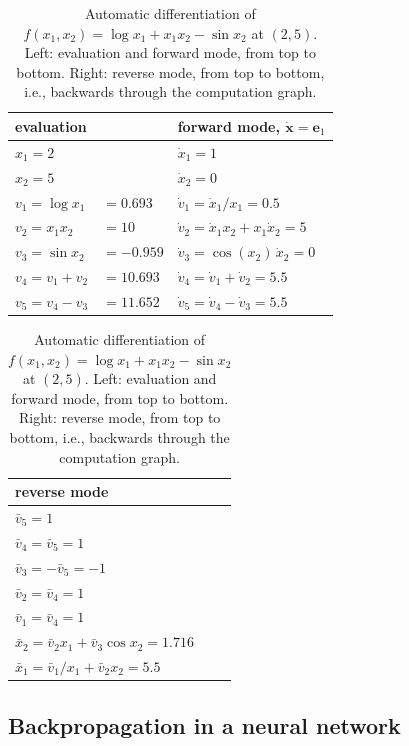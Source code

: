 \begin{table}[ht]
    \centering
    \renewcommand{\arraystretch}{1.3}
    \begin{tabular}{lll}
        \hline
        evaluation & & forward mode, $\dot{\mathbf{x}} = \mathbf{e}_1$ \\
        \hline
        $x_1 = 2$ & & $\dot x_1 = 1$ \\
        $x_2 = 5$ & & $\dot x_2 = 0$ \\
        $v_1 = \log x_1$ & $= 0.693$ & $\dot v_1 = \dot x_1 / x_1 = 0.5$ \\
        $v_2 = x_1 x_2$ & $= 10$ & $\dot v_2 = \dot x_1 x_2 + x_1 \dot x_2 = 5$ \\
        $v_3 = \sin x_2$ & $= -0.959$ & $\dot v_3 = \cos(x_2)\, \dot x_2 = 0$ \\
        $v_4 = v_1 + v_2$ & $= 10.693$ & $\dot v_4 = \dot v_1 + \dot v_2 = 5.5$ \\
        $v_5 = v_4 - v_3$ & $= 11.652$ & $\dot v_5 = \dot v_4 - \dot v_3 = 5.5$ \\
        \hline
    \end{tabular}
    \qquad
    \begin{tabular}{l}
        \hline
        reverse mode \\
        \hline
        $\bar v_5 = 1$ \\
        $\bar v_4 = \bar v_5 = 1$ \\
        $\bar v_3 = -\bar v_5 = -1$ \\
        $\bar v_2 = \bar v_4 = 1$ \\
        $\bar v_1 = \bar v_4 = 1$ \\
        $\bar x_2 = \bar v_2 x_1 + \bar v_3 \cos x_2 = 1.716$ \\
        $\bar x_1 = \bar v_1 / x_1 + \bar v_2 x_2 = 5.5$ \\
        \hline
    \end{tabular}
    \caption{Automatic differentiation of $f(x_1, x_2) = \log x_1 + x_1 x_2 - \sin x_2$ at $(2, 5)$. Left: evaluation and forward mode, from top to bottom. Right: reverse mode, from top to bottom, i.e., backwards through the computation graph.}
    \label{L3-tab:autodiff}
\end{table}

\subsection{Backpropagation in a neural network}

